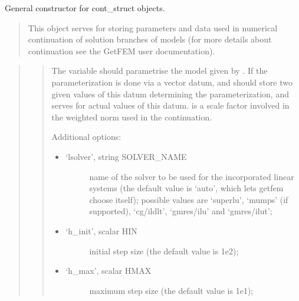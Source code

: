 \documentclass[a4paper,11pt,english]{sphinxmanual}
\begin{document}

General constructor for cont\_struct objects.
\begin{quote}

This object serves for storing parameters and data used in numerical
continuation of solution branches of models (for more details about
continuation see the GetFEM user documentation).
\end{quote}

\begin{quote}

\begin{quote}

The variable  should parametrise the model given by
. If the parameterization is done via a vector datum, 
and  should store two given values of this datum
determining the parameterization, and  serves for actual
values of this datum.  is a scale factor involved in the weighted
norm used in the continuation.

Additional options:
\begin{itemize}
\item {} \begin{description}
\item[{‘lsolver’, string SOLVER\_NAME}] \leavevmode
name of the solver to be used for the incorporated linear systems
(the default value is ‘auto’, which lets getfem choose itself);
possible values are ‘superlu’, ‘mumps’ (if supported), ‘cg/ildlt’,
‘gmres/ilu’ and ‘gmres/ilut’;

\end{description}

\item {} \begin{description}
\item[{‘h\_init’, scalar HIN}] \leavevmode
initial step size (the default value is 1e\sphinxhyphen{}2);

\end{description}

\item {} \begin{description}
\item[{‘h\_max’, scalar HMAX}] \leavevmode
maximum step size (the default value is 1e\sphinxhyphen{}1);


\end{description}
\end{itemize}
\end{quote}
\end{quote}
\end{document}

